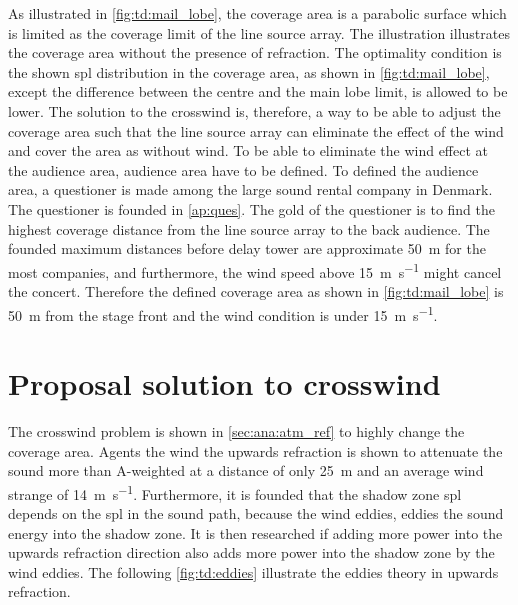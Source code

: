 As illustrated in \autoref{fig:td:mail_lobe}, the coverage area is a parabolic surface which is limited as the  coverage limit of the line source array. The illustration illustrates the coverage area without the presence of refraction. The optimality condition is the shown \gls{spl} distribution in the coverage area, as shown in \autoref{fig:td:mail_lobe}, except the difference between the centre and the main lobe limit, is allowed to be lower. The solution to the crosswind is, therefore, a way to be able to adjust the coverage area such that the line source array can eliminate the effect of the wind and cover the area as without wind. To be able to eliminate the wind effect at the audience area, audience area have to be defined. To defined the audience area, a questioner is made among the large sound rental company in Denmark. The questioner is founded in \autoref{ap:ques}. The gold of the questioner is to find the highest coverage distance from the line source array to the back audience. The founded maximum distances before delay tower are approximate \SI{50}{\meter} for the most companies, and furthermore, the wind speed above \SI{15}{\meter\per\second} might cancel the concert. Therefore the defined coverage area as shown in \autoref{fig:td:mail_lobe} is \SI{50}{\meter} from the stage front and the wind condition is under \SI{15}{\meter\per\second}.



\section{Proposal solution to crosswind}\label{sec:des:pro_cross}
The crosswind problem is shown in \autoref{sec:ana:atm_ref} to highly change the coverage area. Agents the wind the upwards refraction is shown to attenuate the sound more than  A-weighted at a distance of only \SI{25}{\meter} and an average wind strange of \SI{14}{\meter\per\second}. Furthermore, it is founded that the shadow zone \gls{spl} depends on the \gls{spl} in the sound path, because the wind eddies, eddies the sound energy into the shadow zone. It is then researched if adding more power into the upwards refraction direction also adds more power into the shadow zone by the wind eddies. The following \autoref{fig:td:eddies} illustrate the eddies theory in upwards refraction.


